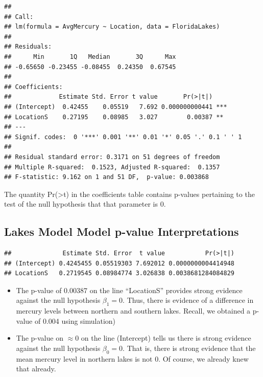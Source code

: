 \documentclass[]{book}
\newenvironment{Shaded}{\begin{snugshade}}{\end{snugshade}}
\newcommand{\KeywordTok}[1]{\textcolor[rgb]{0.13,0.29,0.53}{\textbf{#1}}}
\newcommand{\OperatorTok}[1]{\textcolor[rgb]{0.81,0.36,0.00}{\textbf{#1}}}
\newcommand{\NormalTok}[1]{#1}
\begin{document}
\begin{verbatim}
## 
## Call:
## lm(formula = AvgMercury ~ Location, data = FloridaLakes)
## 
## Residuals:
##      Min       1Q   Median       3Q      Max 
## -0.65650 -0.23455 -0.08455  0.24350  0.67545 
## 
## Coefficients:
##             Estimate Std. Error t value       Pr(>|t|)    
## (Intercept)  0.42455    0.05519   7.692 0.000000000441 ***
## LocationS    0.27195    0.08985   3.027        0.00387 ** 
## ---
## Signif. codes:  0 '***' 0.001 '**' 0.01 '*' 0.05 '.' 0.1 ' ' 1
## 
## Residual standard error: 0.3171 on 51 degrees of freedom
## Multiple R-squared:  0.1523, Adjusted R-squared:  0.1357 
## F-statistic: 9.162 on 1 and 51 DF,  p-value: 0.003868
\end{verbatim}

The quantity Pr(\textgreater{}\textbar{}t\textbar{}) in the coefficients
table contains p-values pertaining to the test of the null hypothesis
that that parameter is 0.

\subsection{Lakes Model Model p-value
Interpretations}\label{lakes-model-model-p-value-interpretations}

\begin{Shaded}
\end{Shaded}

\begin{verbatim}
##              Estimate Std. Error  t value           Pr(>|t|)
## (Intercept) 0.4245455 0.05519303 7.692012 0.0000000004414948
## LocationS   0.2719545 0.08984774 3.026838 0.0038681284084829
\end{verbatim}

\begin{itemize}
\item
  The p-value of 0.00387 on the line ``LocationS'' provides strong
  evidence against the null hypothesis \(\beta_1=0\). Thus, there is
  evidence of a difference in mercury levels between northern and
  southern lakes. Recall, we obtained a p-value of 0.004 using
  simulation)
\item
  The p-value on \(\approx 0\) on the line (Intercept) tells us there is
  strong evidence against the null hypothesis \(\beta_0=0\). That is,
  there is strong evidence that the mean mercury level in northern lakes
  is not 0. Of course, we already knew that already.
\end{itemize}
\end{document}
